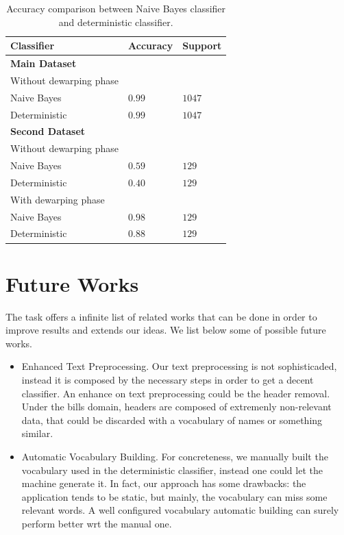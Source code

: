 \documentclass[10pt,twocolumn,letterpaper]{article}
\begin{document}
\begin{table}[!h]
  \begin{center}
    \begin{tabular}{lll}
      \hline
      Classifier              & Accuracy & Support \\ \hline
      \textbf{Main Dataset}                        \\
      \small Without dewarping phase               \\
      \; \; Naive Bayes       & $0.99$   & $1047$  \\
      \; \; Deterministic     & $0.99$   & $1047$  \\ \hline

      \textbf{Second Dataset} &          &         \\
      \small Without dewarping phase               \\
      \; \; Naive Bayes       & $0.59$   & $129$   \\
      \; \; Deterministic     & $0.40$   & $129$   \\

      \small With dewarping phase                  \\
      \; \; Naive Bayes       & $0.98$   & $129$   \\
      \; \; Deterministic     & $0.88$   & $129$   \\ \hline
    \end{tabular}
  \end{center}
  \label{table:classifiers-comparison}
  \caption{Accuracy comparison between Naive Bayes classifier and
    deterministic classifier.}
\end{table}

\section{Future Works}
\label{sec:future-works}

The task offers a infinite list of related works that can be done in
order to improve results and extends our ideas. We list below some of
possible future works.

\begin{itemize}
  \item Enhanced Text Preprocessing. Our text preprocessing is not
    sophisticaded, instead it is composed by the necessary steps in
    order to get a decent classifier. An enhance on text preprocessing
    could be the header removal. Under the bills domain, headers are
    composed of extremenly non-relevant data, that could be discarded
    with a vocabulary of names or something similar.
  \item Automatic Vocabulary Building. For concreteness, we manually
    built the vocabulary used in the deterministic classifier, instead
    one could let the machine generate it. In fact, our approach has
    some drawbacks: the application tends to be static, but mainly,
    the vocabulary can miss some relevant words. A well configured
    vocabulary automatic building can surely perform better wrt the
    manual one.
\end{itemize}
\end{document}
